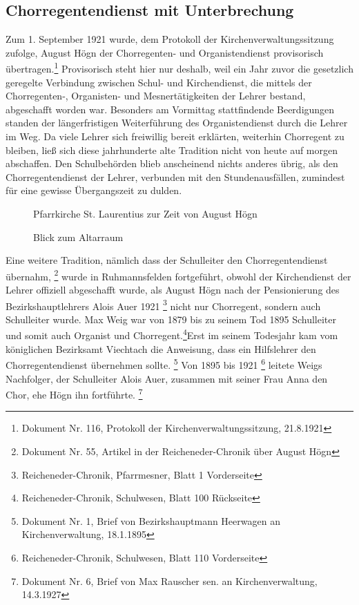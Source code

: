 \subsection{Chorregentendienst mit Unterbrechung}

Zum 1. September 1921 wurde, dem
Protokoll der Kirchenverwaltungssitzung zufolge, August Högn der
Chorregenten- und Organistendienst provisorisch übertragen.\footnote{
Dokument Nr. 116, Protokoll der Kirchenverwaltungssitzung, 21.8.1921}
Provisorisch steht hier nur deshalb, weil ein Jahr zuvor die gesetzlich
geregelte Verbindung zwischen Schul- und Kirchendienst, die mittels der
Chorregenten-, Organisten- und Mesnertätigkeiten der Lehrer bestand,
abgeschafft worden war. Besonders am Vormittag stattfindende
Beerdigungen standen der längerfristigen Weiterführung des
Organistendienst durch die Lehrer im Weg. Da viele Lehrer sich
freiwillig bereit erklärten, weiterhin Chorregent zu bleiben, ließ sich
diese jahrhunderte alte Tradition nicht von heute auf morgen
abschaffen. Den Schulbehörden blieb anscheinend nichts anderes übrig,
als den Chorregentendienst der Lehrer, verbunden mit den
Stundenausfällen, zumindest für eine gewisse Übergangszeit zu dulden.

\begin{figure}
\caption{Pfarrkirche St. Laurentius zur Zeit von August Högn}
\end{figure}

\begin{figure}
\caption{Blick zum Altarraum}
\end{figure}

Eine weitere Tradition, nämlich dass der Schulleiter den
Chorregentendienst übernahm, \footnote{Dokument Nr. 55, Artikel in der
Reicheneder-Chronik über August Högn} wurde in Ruhmannsfelden
fortgeführt, obwohl der Kirchendienst der Lehrer offiziell abgeschafft
wurde, als August Högn nach der Pensionierung des Bezirkshauptlehrers
Alois Auer 1921 \footnote{Reicheneder-Chronik, Pfarrmesner, Blatt 1
Vorderseite} nicht nur Chorregent, sondern
auch Schulleiter wurde. Max Weig war von 1879 bis zu seinem Tod 1895
Schulleiter und somit auch Organist und Chorregent.\footnote{
Reicheneder-Chronik, Schulwesen, Blatt 100
Rückseite}Erst im seinem Todesjahr kam vom
königlichen Bezirksamt Viechtach die Anweisung, dass ein Hilfslehrer
den Chorregentendienst übernehmen sollte. \footnote{Dokument Nr. 1,
Brief von Bezirkshauptmann Heerwagen an Kirchenverwaltung, 18.1.1895}
Von 1895 bis 1921 \footnote{Reicheneder-Chronik, Schulwesen, Blatt 110
Vorderseite} leitete Weigs Nachfolger, der Schulleiter Alois Auer,
zusammen mit seiner Frau Anna den Chor, ehe Högn ihn
fortführte. \footnote{Dokument Nr. 6, Brief von Max Rauscher sen. an
Kirchenverwaltung, 14.3.1927}

